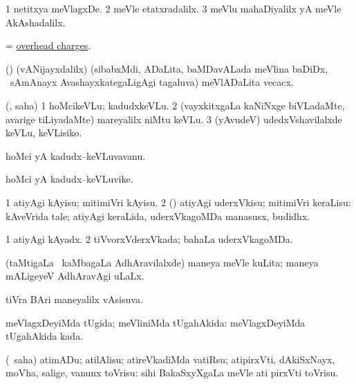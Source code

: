 \bentry
{}
\gl{\kirxvi}
\bmng
\bnum
\num{1} netitxya meVlagxDe. 
\num{2} meVle etatxradalilx. 
\num{3} meVlu mahaDiyalilx yA meVle AkAshadalilx. 
\enum
\emng
\eentry

\bentry
{}
\gl{\nA}
\bmng
= \hyperlink{overhead charges}{overhead charges}. 
\emng
\eentry

\bentry
{}
\gl{\nA}
\bmng
(\bava) (vANijayxdalilx) (sibabxMdi, ADaLita, baMDavALada meVlina baDiDx, \mo\ sAmAnayx AvashayxkategaLigAgi tagaluva) meVlADaLita vecacx. 
\emng
\eentry

\bentry
{}
\gl{\sakirx}
\bmng
(\akirx, saha) 
\bnum
\num{1} hoMcikeVLu; kadudxkeVLu. 
\num{2} (vayxkitxgaLa kaNiNxge biVLadaMte, avarige tiLiyadaMte) mareyalilx niMtu keVLu. 
\num{3} (yAvudeV) udedxVshavilalxde keVLu, keVLisiko. 
\enum
\emng
\eentry

\bentry
{}
\gl{\nA}
\bmng
hoMci yA kadudx--keVLuvavanu. 
\emng
\eentry


\bentry
{}
\gl{\nA}
\bmng
hoMci yA kadudx--keVLuvike. 
\emng
\eentry


\bentry
{}
\gl{\sakirx}
\bmng
\bnum
\num{1} atiyAgi kAyisu; mitimiVri kAyisu. 
\num{2} (\rUpa) atiyAgi uderxVkisu; mitimiVri keraLisu:  kAveVrida tale; atiyAgi keraLida, uderxVkagoMDa manasusx, budidhx. 
\enum
\emng
\eentry


\bentry
{}
\gl{\gu}
\bmng
\bnum
\num{1} atiyAgi kAyadx. 
\num{2} tiVvorxVderxVkada; bahaLa uderxVkagoMDa. 
\enum
\emng
\eentry


\bentry
{}
\gl{\gu}
\bmng
(taMtigaLa \vi\ kaMbagaLa AdhAravilalxde) maneya meVle kuLita; maneya mALigeyeV AdhAravAgi uLaLx. 
\emng
\eentry


\bentry
{}
\gl{\gu}
\bmng
tiVra BAri maneyalilx vAsisuva. 
\emng
\eentry


\bentry
{}
\gl{\gu}
\bmng
meVlagxDeyiMda tUgida; meVliniMda tUgahAkida:  meVlagxDeyiMda tUgahAkida kada. 
\emng
\eentry


\bentry
{}
\gl{\sakirx}
\bmng
(\sakirx\ saha) atimADu; atilAlisu; atireVkadiMda vatiRsu; atipirxVti, dAkiSxNayx, moVha, salige, \mo vanunx toVrisu:  sihi BakaSxyXgaLa meVle ati pirxVti toVrisu. 
\emng
\eentry

